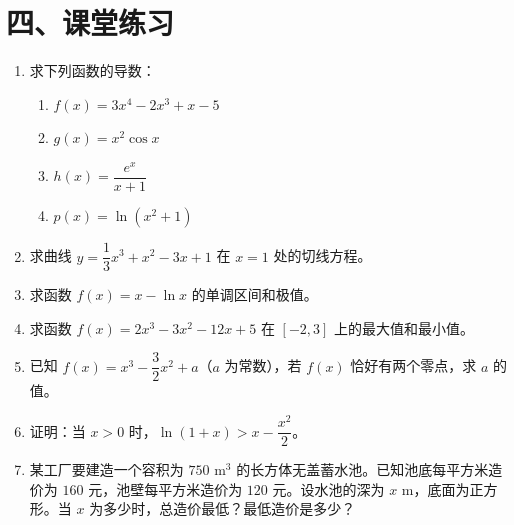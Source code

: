 \documentclass[12pt, a4paper]{ctexart}
\begin{document}
\section*{\textcolor{tipgreen}{四、课堂练习}}

\begin{enumerate}[leftmargin=2em]
  \item 求下列函数的导数：
  \begin{enumerate}[label=(\arabic*)]
    \item $f(x) = 3x^4 - 2x^3 + x - 5$
    \item $g(x) = x^2 \cos x$
    \item $h(x) = \dfrac{e^x}{x + 1}$
    \item $p(x) = \ln(x^2 + 1)$
  \end{enumerate}

  \item 求曲线 $y = \dfrac{1}{3}x^3 + x^2 - 3x + 1$ 在 $x = 1$ 处的切线方程。

  \item 求函数 $f(x) = x - \ln x$ 的单调区间和极值。

  \item 求函数 $f(x) = 2x^3 - 3x^2 - 12x + 5$ 在 $[-2, 3]$ 上的最大值和最小值。

  \item 已知 $f(x) = x^3 - \dfrac{3}{2}x^2 + a$（$a$ 为常数），若 $f(x)$ 恰好有两个零点，求 $a$ 的值。

  \item 证明：当 $x > 0$ 时，$\ln(1 + x) > x - \dfrac{x^2}{2}$。

  \item 某工厂要建造一个容积为 $750 \text{ m}^3$ 的长方体无盖蓄水池。已知池底每平方米造价为 $160$ 元，池壁每平方米造价为 $120$ 元。设水池的深为 $x$ m，底面为正方形。当 $x$ 为多少时，总造价最低？最低造价是多少？
\end{enumerate}

\vspace{10pt}
\end{document}
